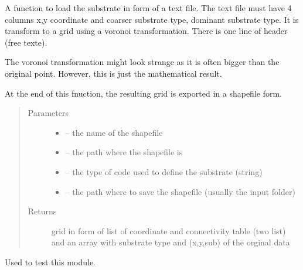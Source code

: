\documentclass[letterpaper,10pt,english]{sphinxmanual}
\begin{document}
\begin{fulllineitems}
\label{\detokenize{index:src.substrate.load_sub_txt}}
A function to load the substrate in form of a text file. The text file must have 4 columns x,y coordinate and
coarser substrate type, dominant substrate type. It is transform to a grid using a voronoi
transformation. There is one line of header (free texte).

The voronoi transformation might look strange as it is often bigger than the original point. However, this is
just the mathematical result.

At the end of this fnuction, the resulting grid is exported in a shapefile form.
\begin{quote}\begin{description}
\item[{Parameters}] \leavevmode\begin{itemize}
\item {} 
 -- the name of the shapefile

\item {} 
 -- the path where the shapefile is

\item {} 
 -- the type of code used to define the substrate (string)

\item {} 
 -- the path where to save the shapefile (usually the input folder)

\end{itemize}

\item[{Returns}] \leavevmode
grid in form of list of coordinate and connectivity table (two list)
and an array with substrate type and (x,y,sub) of the orginal data

\end{description}\end{quote}

\end{fulllineitems}


\begin{fulllineitems}
\label{\detokenize{index:src.substrate.main}}
Used to test this module.

\end{fulllineitems}
\end{document}
